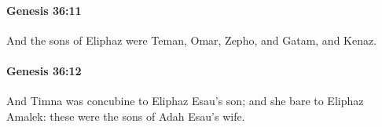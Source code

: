 		\paragraph{Genesis 36:11} %
			\label{GENESIS-36-11}

			And the sons of Eliphaz were Teman, Omar, Zepho, and Gatam, and Kenaz.


		\paragraph{Genesis 36:12} %
			\label{GENESIS-36-12}

			And Timna was concubine to Eliphaz Esau's son; and she bare to Eliphaz Amalek: these were the sons of Adah Esau's wife.


